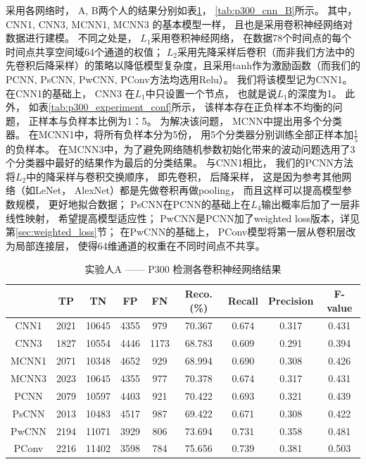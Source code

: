 采用各网络时， A, B两个人的结果分别如表\ref{tab:p300_cnn_A}， \ref{tab:p300_cnn_B}所示。 其中， CNN1, CNN3, MCNN1, MCNN3 \cite{cecotti2011convolutional}的基本模型一样， 且也是采用卷积神经网络对数据进行建模。 不同之处是， $L_1$采用卷积神经网络， 在数据78个时间点的每个时间点共享空间域64个通道的权值； $L_2$采用先降采样后卷积（而非我们方法中的先卷积后降采样）的策略以降低模型复杂度，且采用tanh作为激励函数（而我们的PCNN, PsCNN, PwCNN, PConv方法均选用Relu）。 我们将该模型记为CNN1。
在CNN1的基础上， CNN3 在$L_1$中只设置一个节点， 也就是说$L_1$的深度为1。 此外， 如表\ref{tab:p300_experiment_conf}所示， 该样本存在正负样本不均衡的问题， 正样本与负样本比例为1：5。 为解决该问题， MCNN中提出用多个分类器。 在MCNN1中，将所有负样本分为5份， 用5个分类器分别训练全部正样本加$\frac{1}{5}$的负样本。 在MCNN3中，为了避免网络随机参数初始化带来的波动问题选用了3个分类器中最好的结果作为最后的分类结果。 与CNN1相比， 我们的PCNN方法将$L_2$中的降采样与卷积交换顺序， 即先卷积， 后降采样， 这是因为参考其他网络（如LeNet， AlexNet）都是先做卷积再做pooling， 而且这样可以提高模型参数规模， 更好地拟合数据； PsCNN在PCNN的基础上在$L_4$输出概率后加了一层非线性映射， 希望提高模型适应性； PwCNN是PCNN加了weighted loss版本，详见第\ref{sec:weighted_loss}节； 在PwCNN的基础上， PConv模型将第一层从卷积层改为局部连接层， 使得64维通道的权重在不同时间点不共享。 



\begin{table}[ht]
\centering
  \begin{tabular}{|c||c|c|c|c|c|c|c|c|}
  \hline
   & TP & TN & FP & FN & Reco.(\%) & Recall & Precision & F-value \\
  \hline\hline
	CNN1 & 2021 & 10645 & 4355 & 979 & 70.367  & 0.674  & 0.317  & 0.431 \\
	\hline
	CNN3 & 1827 & 10554 & 4446 & 1173 & 68.783  & 0.609  & 0.291  & 0.394 \\
	\hline
	MCNN1 & 2071 & 10348 & 4652 & 929 & 68.994  & 0.690  & 0.308  & 0.426 \\
	\hline
	MCNN3 & 2023 & 10645 & 4355 & 977 & 70.378  & 0.674  & 0.317  & 0.431 \\
	\hline
	PCNN & 2079 & 10597 & 4403 & 921 & 70.422  & 0.693  & 0.321  & 0.439 \\
	\hline
	PsCNN & 2013 & 10483 & 4517 & 987 & 69.422  & 0.671  & 0.308  & 0.422 \\
	\hline
	PwCNN & 2194 & 11071 & 3929 & 806 & 73.694  & 0.731  & 0.358  & 0.481 \\
	\hline
	PConv & 2216 & 11402 & 3598 & 784 & 75.656  & 0.739  & 0.381  & 0.503 \\
  \hline
  \end{tabular}
  \caption{实验人A —— P300 检测各卷积神经网络结果}
  \centering \label{tab:p300_cnn_A}
\end{table}


